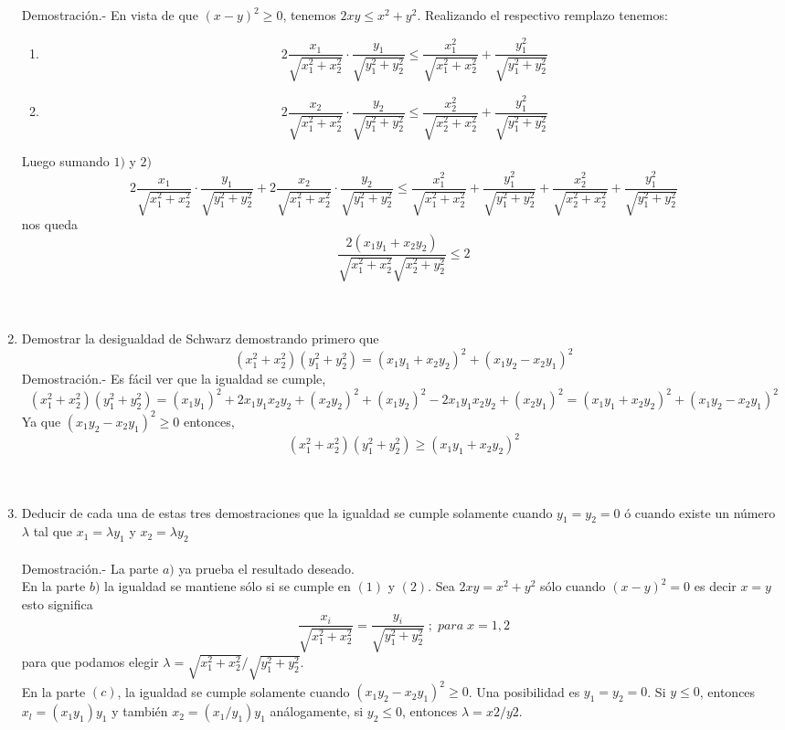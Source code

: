 \begin{teo}
\begin{enumerate}[\bfseries a)]
Demostración.- \;  En vista de que $(x-y)^2\geq 0$, tenemos $2xy\leq x^2+y^2$. Realizando el respectivo remplazo tenemos:
\begin{enumerate}[\bfseries 1)]
\item $$2\dfrac{x_1}{\sqrt{x_1^2 + x_2^2}}\cdot \dfrac{y_1}{\sqrt{y_1^2+y_2^2}}\leq \dfrac{x_1^2}{\sqrt{x_1^2 + x_2^2}} + \dfrac{y_1^2}{\sqrt{y_1^2+y_2^2}}$$
\item $$2\dfrac{x_2}{\sqrt{x_1^2 + x_2^2}}\cdot \dfrac{y_2}{\sqrt{y_1^2+y_2^2}}\leq \dfrac{x_2^2}{\sqrt{x_2^2 + x_2^2}} + \dfrac{y_1^2}{\sqrt{y_1^2+y_2^2}}$$
\end{enumerate}
Luego sumando $1)$ y $2)$ $$2\dfrac{x_1}{\sqrt{x_1^2 + x_2^2}}\cdot \dfrac{y_1}{\sqrt{y_1^2+y_2^2}}+2\dfrac{x_2}{\sqrt{x_1^2 + x_2^2}}\cdot \dfrac{y_2}{\sqrt{y_1^2+y_2^2}}\leq \dfrac{x_1^2}{\sqrt{x_1^2 + x_2^2}} + \dfrac{y_1^2}{\sqrt{y_1^2+y_2^2}}+\dfrac{x_2^2}{\sqrt{x_2^2 + x_2^2}} + \dfrac{y_1^2}{\sqrt{y_1^2+y_2^2}}$$ nos queda $$\dfrac{2(x_1y_1+x_2y_2)}{\sqrt{x_1^2+x_2^2}\sqrt{x_2^2+y_2^2}}\leq 2$$\\\\
\item Demostrar la desigualdad de Schwarz demostrando primero que $$(x_1^2 + x_2^2)(y_1^2 + y_2^2)=(x_1 y_1 + x_2 y_2)^2 + (x_1 y_2 - x_2 y_1)^2$$
Demostración.- \; Es fácil ver que la igualdad se cumple, $$(x_1^2 + x_2^2)(y_1^2 + y_2^2)=(x_1 y_1)^2 +2x_1 y_1 x_2 y_2 + (x_2 y_2 ) ^2 + (x_1 y_2)^2 -2x_1 y_1 x_2 y_2 + (x_2 y_1)^2=(x_1 y_1 + x_2 y_2)^2 + (x_1 y_2 - x_2 y_1)^2$$
Ya que $(x_1 y_2 - x_2 y_1)^2\geq 0$ entonces, $$(x_1^2 + x_2^2)(y_1^2 + y_2^2)\geq (x_1 y_1 + x_2 y_2)^2$$\\\\
\item Deducir de cada una de estas tres demostraciones que la igualdad se cumple solamente cuando $y_1 = y_2 = 0$ ó cuando existe un número $\lambda$ tal que $x_1=\lambda y_1$\; y \; $x_2= \lambda y_2$\\\\
Demostración.- \; La parte $a)$ ya prueba el resultado deseado.\\
En la parte $b)$ la igualdad se mantiene sólo si se cumple en $(1)$ y $(2)$. Sea $2xy=x^2+y^2$ sólo cuando $(x-y)^2=0$ es decir $x=y$ esto significa $$\dfrac{x_i}{\sqrt{x_1^2 + x_2^2}}= \dfrac{y_i}{\sqrt{y_1^2+y_2^2}} \; ; \; para \; x=1,2$$ para que podamos elegir $\lambda = \sqrt{x_1^2 + x_2^2} / \sqrt{y_1^2 + y_2^2}$.\\
En la parte $(c)$, la igualdad se cumple solamente cuando $(x_1 y_2 - x_2 y_1)^2 \geq 0$. Una posibilidad es $y_1 = y_2 = 0$. Si $y\leq 0$, entonces $x_l = (x_1 y_1)y_1$ \; y también $x_2 = (x_1 / y_1)y_1$ análogamente, si $y_2\leq 0$, entonces $\lambda = x2/y2$.\\\\
\end{enumerate}
\end{teo}


